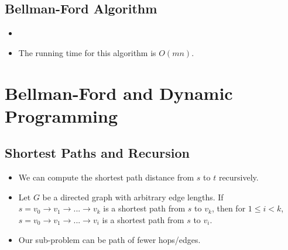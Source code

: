 \documentclass[12pt]{article}
\begin{document}
\subsection{Bellman-Ford Algorithm}
\begin{itemize}
    \item[] 
    \item The running time for this algorithm is $O(mn)$.
\end{itemize}

\section{Bellman-Ford and Dynamic Programming}

\subsection{Shortest Paths and Recursion}
\begin{itemize}
    \item We can compute the shortest path distance from $s$ to $t$ recursively.
    \item Let $G$ be a directed graph with arbitrary edge lengths. If $s = v_0 \rightarrow v_1 \rightarrow ... \rightarrow v_k$ is a shortest path from $s$ to $v_k$, then for $1 \leq i < k$, $s = v_0 \rightarrow v_1 \rightarrow ... \rightarrow v_i$ is a shortest path from $s$ to $v_i$.
    \item Our sub-problem can be path of fewer hops/edges.
\end{itemize}
\end{document}
